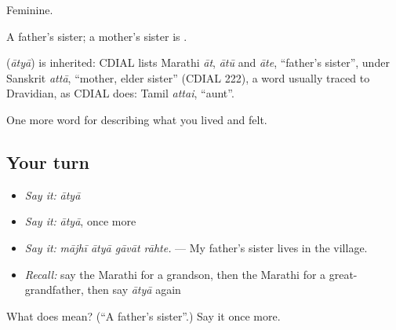 Feminine.

A father's sister; a mother's sister is .

\begin{cousinweb}
\textbf{} (\emph{ātyā}) is inherited: CDIAL lists Marathi \emph{āt}, \emph{ātū} and \emph{āte}, \textquotedblleft{}father's sister\textquotedblright{}, under Sanskrit \emph{attā}, \textquotedblleft{}mother, elder sister\textquotedblright{} (CDIAL 222), a word usually traced to Dravidian, as CDIAL does: Tamil \emph{attai}, \textquotedblleft{}aunt\textquotedblright{}.
\end{cousinweb}

\begin{grammarlens}[title={What you've built}]
One more word for describing what you lived and felt.
\end{grammarlens}

\subsection*{Your turn}
\begin{itemize}
\raggedright
  \item \emph{Say it:} \emph{ātyā}
  \item \emph{Say it:} \emph{ātyā}, once more
  \item \emph{Say it:} \emph{mājhī ātyā gāvāt rāhte.} — My father's sister lives in the village.
  \item \emph{Recall:} say the Marathi for a grandson, then the Marathi for a great-grandfather, then say \emph{ātyā} again
\end{itemize}

\begin{tcolorbox}[breakable,colback=teal!4,colframe=teal!35!black,title={Before you move on}]
What does  mean? (\textquotedblleft{}A father's sister\textquotedblright{}.) Say it once more.
\end{tcolorbox}
